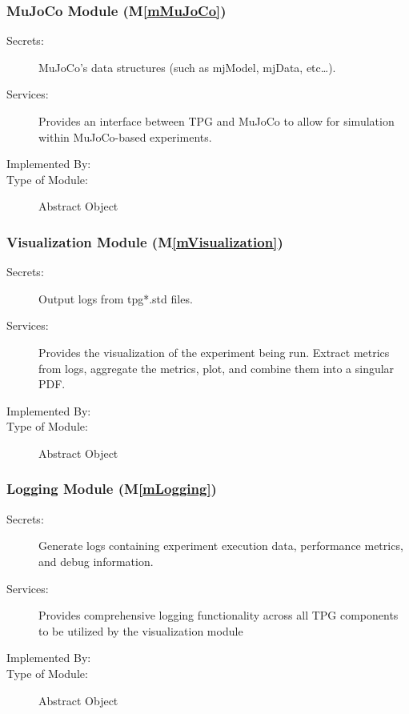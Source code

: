 \documentclass[12pt, titlepage]{article}
\newcommand{\mref}[1]{M\ref{#1}}
\begin{document}
\subsubsection{MuJoCo Module (\mref{mMuJoCo})}

\begin{description}
\item[Secrets:]MuJoCo's data structures (such as mjModel, mjData, etc…).
\item[Services:]Provides an interface between TPG and MuJoCo to allow for simulation within MuJoCo-based experiments.
\item[Implemented By:] \progname{}
\item[Type of Module:] Abstract Object
\end{description}

\subsubsection{Visualization Module (\mref{mVisualization})}

\begin{description}
\item[Secrets:]Output logs from tpg*.std files.
\item[Services:]Provides the visualization of the experiment being run. Extract metrics from logs, aggregate the metrics, plot, and combine them into a singular PDF.
\item[Implemented By:] \progname{}
\item[Type of Module:] Abstract Object
\end{description}


\subsubsection{Logging Module  (\mref{mLogging})}

\begin{description}
\item[Secrets:] Generate logs containing experiment execution data, performance metrics, and debug information.
\item[Services:] Provides comprehensive logging functionality across all TPG components to be utilized by the visualization module
\item[Implemented By:] \progname{}
\item[Type of Module:] Abstract Object
\end{description}

\end{document}
